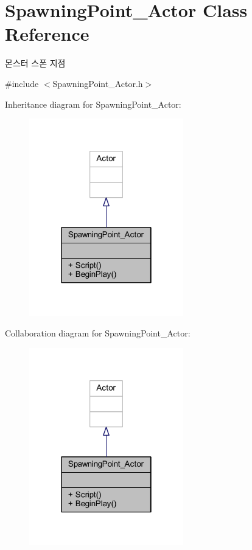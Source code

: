 \hypertarget{class_spawning_point___actor}{}\section{Spawning\+Point\+\_\+\+Actor Class Reference}
\label{class_spawning_point___actor}


몬스터 스폰 지점  




{\ttfamily \#include $<$Spawning\+Point\+\_\+\+Actor.\+h$>$}



Inheritance diagram for Spawning\+Point\+\_\+\+Actor\+:
\nopagebreak
\begin{figure}[H]
\begin{center}
\leavevmode
\includegraphics[width=190pt]{class_spawning_point___actor__inherit__graph}
\end{center}
\end{figure}


Collaboration diagram for Spawning\+Point\+\_\+\+Actor\+:
\nopagebreak
\begin{figure}[H]
\begin{center}
\leavevmode
\includegraphics[width=190pt]{class_spawning_point___actor__coll__graph}
\end{center}
\end{figure}
